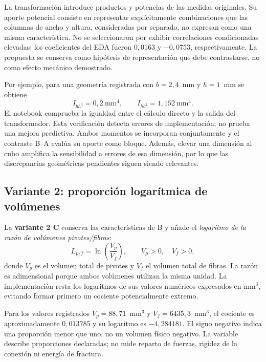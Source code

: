 La transformación introduce productos y potencias de las medidas originales. Su aporte potencial consiste en representar explícitamente combinaciones que las columnas de ancho y altura, consideradas por separado, no expresan como una misma característica. No se seleccionaron por exhibir correlaciones condicionadas elevadas: los coeficientes del EDA fueron $0{,}0163$ y $-0{,}0753$, respectivamente. La propuesta se conserva como hipótesis de representación que debe contrastarse, no como efecto mecánico demostrado.

Por ejemplo, para una geometría registrada con $b=2{,}4$~mm y $h=1$~mm se obtiene
\begin{equation}
I_{bh^3}=0{,}2~\mathrm{mm}^4,\qquad
I_{hb^3}=1{,}152~\mathrm{mm}^4.
\label{eq:ejemplo-momentos}
\end{equation}
El notebook comprueba la igualdad entre el cálculo directo y la salida del transformador. Esta verificación detecta errores de implementación; no prueba una mejora predictiva. Ambos momentos se incorporan conjuntamente y el contraste B--A evalúa su aporte como bloque. Además, elevar una dimensión al cubo amplifica la sensibilidad a errores de esa dimensión, por lo que las discrepancias geométricas pendientes siguen siendo relevantes.

\subsection{Variante 2: proporción logarítmica de volúmenes}
La \textbf{variante 2 C} conserva las características de B y añade el \emph{logaritmo de la razón de volúmenes pivotes/fibras}:
\begin{equation}
L_{p/f}=\ln\!\left(\frac{V_p}{V_f}\right),\qquad V_p>0,\quad V_f>0,
\label{eq:logratio}
\end{equation}
donde $V_p$ es el volumen total de pivotes y $V_f$ el volumen total de fibras. La razón es adimensional porque ambos volúmenes utilizan la misma unidad. La implementación resta los logaritmos de sus valores numéricos expresados en mm$^3$, evitando formar primero un cociente potencialmente extremo.

Para los valores registrados $V_p=88{,}71$~mm$^3$ y $V_f=6435{,}3$~mm$^3$, el cociente es aproximadamente $0{,}013785$ y su logaritmo es $-4{,}284181$. El signo negativo indica una proporción menor que uno, no un volumen físico negativo. La variable describe proporciones declaradas; no mide reparto de fuerzas, rigidez de la conexión ni energía de fractura.

